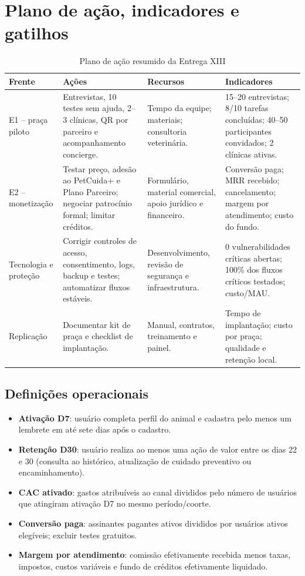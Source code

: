 \section{Plano de ação, indicadores e gatilhos}
\begin{table}[H]\centering
\caption{Plano de ação resumido da Entrega XIII}
\small
\begin{tabularx}{\textwidth}{L{2.5cm}Y L{2.5cm}Y}
\toprule
Frente & Ações & Recursos & Indicadores\\\midrule
E1 -- praça piloto & Entrevistas, 10 testes sem ajuda, 2--3 clínicas, QR por parceiro e acompanhamento concierge. & Tempo da equipe; materiais; consultoria veterinária. & 15--20 entrevistas; 8/10 tarefas concluídas; 40--50 participantes convidados; 2 clínicas ativas.\\
E2 -- monetização & Testar preço, adesão ao PetCuida+ e Plano Parceiro; negociar patrocínio formal; limitar créditos. & Formulário, material comercial, apoio jurídico e financeiro. & Conversão paga; MRR recebido; cancelamento; margem por atendimento; custo do fundo.\\
Tecnologia e proteção & Corrigir controles de acesso, consentimento, logs, backup e testes; automatizar fluxos estáveis. & Desenvolvimento, revisão de segurança e infraestrutura. & 0 vulnerabilidades críticas abertas; 100\% dos fluxos críticos testados; custo/MAU.\\
Replicação & Documentar kit de praça e checklist de implantação. & Manual, contratos, treinamento e painel. & Tempo de implantação; custo por praça; qualidade e retenção local.\\
\bottomrule
\end{tabularx}\fonteautores
\end{table}

\subsection{Definições operacionais}
\begin{itemize}
\item \textbf{Ativação D7}: usuário completa perfil do animal e cadastra pelo menos um lembrete em até sete dias após o cadastro.
\item \textbf{Retenção D30}: usuário realiza ao menos uma ação de valor entre os dias 22 e 30 (consulta ao histórico, atualização de cuidado preventivo ou encaminhamento).
\item \textbf{CAC ativado}: gastos atribuíveis ao canal divididos pelo número de usuários que atingiram ativação D7 no mesmo período/coorte.
\item \textbf{Conversão paga}: assinantes pagantes ativos divididos por usuários ativos elegíveis; excluir testes gratuitos.
\item \textbf{Margem por atendimento}: comissão efetivamente recebida menos taxas, impostos, custos variáveis e fundo de créditos efetivamente liquidado.
\end{itemize}

